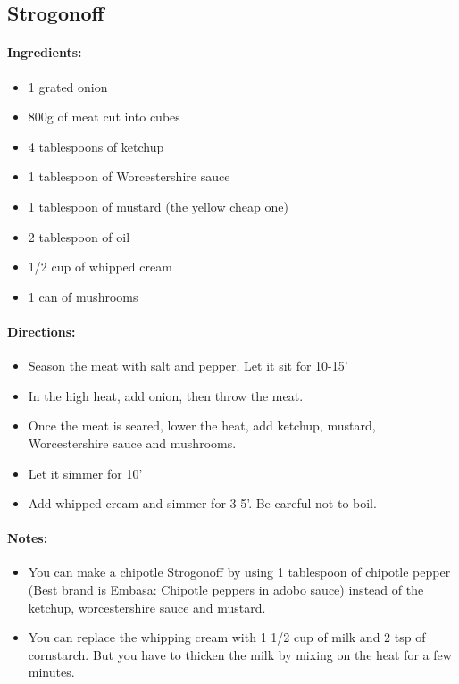 \documentclass{article}
\begin{document}
\subsection{Strogonoff}

\paragraph{Ingredients:}
\begin{itemize}
    \item 1 grated onion
    \item 800g of meat cut into cubes
    \item 4 tablespoons of ketchup
    \item 1 tablespoon of Worcestershire sauce
    \item 1 tablespoon of mustard (the yellow cheap one)
    \item 2 tablespoon of oil
    \item 1/2 cup of whipped cream
    \item 1 can of mushrooms
\end{itemize}

\paragraph{Directions:}
\begin{itemize}
    \item Season the meat with salt and pepper. Let it sit for 10-15'
    \item In the high heat, add onion, then throw the meat.
    \item Once the meat is seared, lower the heat, add ketchup, mustard, Worcestershire sauce and mushrooms.
    \item Let it simmer for 10'
    \item Add whipped cream and simmer for 3-5'. Be careful not to boil.
\end{itemize}

\paragraph{Notes:}
\begin{itemize}
    \item You can make a chipotle Strogonoff by using 1 tablespoon of chipotle pepper (Best brand is Embasa: Chipotle peppers in adobo sauce) instead of the ketchup, worcestershire sauce and mustard.
    \item You can replace the whipping cream with 1 1/2 cup of milk and 2 tsp of cornstarch. But you have to thicken the milk by mixing on the heat for a few minutes.
\end{itemize}
\end{document}
